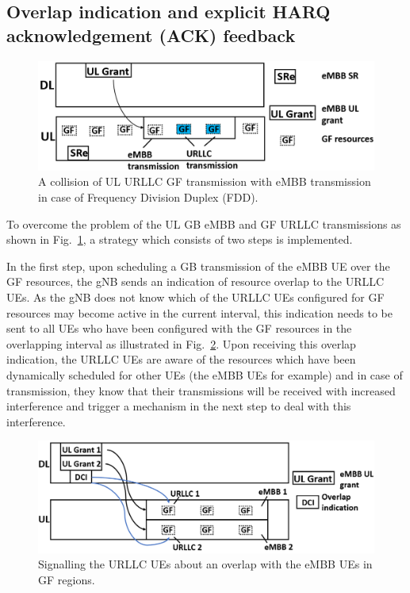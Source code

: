 \documentclass[conference]{IEEEtran}
\begin{document}
\subsection{Overlap indication and explicit HARQ acknowledgement (ACK) feedback}\label{IIAA}
\begin{figure}[htbp]
\centerline{\includegraphics[scale=0.25]{fig1.PNG}}
\caption{A collision of UL URLLC GF transmission with eMBB transmission in case of Frequency Division Duplex (FDD).}
\label{fig1}

\end{figure}
To overcome the problem of the UL GB eMBB and GF URLLC transmissions as shown in Fig.~\ref{fig1}, a strategy which consists of two steps is implemented. 

In the first step, upon scheduling a GB transmission of the eMBB UE over the GF resources, the gNB sends an indication of resource overlap to the URLLC UEs. As the gNB does not know which of the URLLC UEs configured for GF resources may become active in the current interval, this indication needs to be sent to all UEs who have been configured with the GF resources in the overlapping interval as illustrated in Fig.~\ref{fig2}. Upon receiving this overlap indication, the URLLC UEs are aware of the resources which have been dynamically scheduled for other UEs (the eMBB UEs for example) and in case of transmission, they know that their transmissions will be received with increased interference and trigger a mechanism in the next step to deal with this interference.

\begin{figure}[htbp]
\centerline{\includegraphics[scale=0.22]{fig2.PNG}}
\caption{Signalling the URLLC UEs about an overlap with the eMBB UEs in GF regions.}
\label{fig2}
\vspace{-2mm}
\end{figure}
\end{document}
